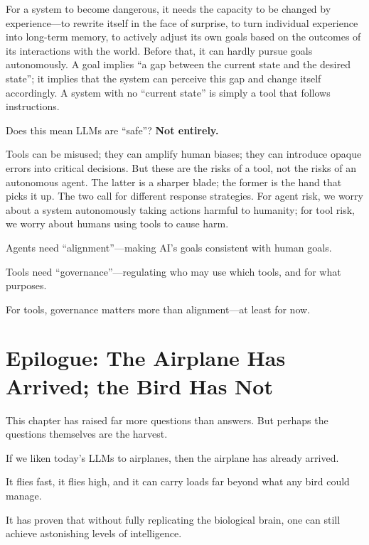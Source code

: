 For a system to become dangerous, it needs the capacity to be changed by experience---to rewrite itself in the face of surprise, to turn individual experience into long-term memory, to actively adjust its own goals based on the outcomes of its interactions with the world.
Before that, it can hardly pursue goals autonomously. A goal implies ``a gap between the current state and the desired state''; it implies that the system can perceive this gap and change itself accordingly. A system with no ``current state'' is simply a tool that follows instructions.


\vspace{1em}

Does this mean LLMs are ``safe''?
\textbf{Not entirely.}

Tools can be misused; they can amplify human biases; they can introduce opaque errors into critical decisions.
But these are the risks of a tool, not the risks of an autonomous agent.
The latter is a sharper blade; the former is the hand that picks it up.
The two call for different response strategies.
For agent risk, we worry about a system autonomously taking actions harmful to humanity; for tool risk, we worry about humans using tools to cause harm.

\vspace{1em}

Agents need ``alignment''---making AI's goals consistent with human goals.

Tools need ``governance''---regulating who may use which tools, and for what purposes.

For tools, governance matters more than alignment---at least for now.


\newpage
\section{Epilogue: The Airplane Has Arrived; the Bird Has Not}

This chapter has raised far more questions than answers. But perhaps the questions themselves are the harvest.

If we liken today's LLMs to airplanes, then the airplane has already arrived.

It flies fast, it flies high, and it can carry loads far beyond what any bird could manage.

It has proven that without fully replicating the biological brain, one can still achieve astonishing levels of intelligence.

